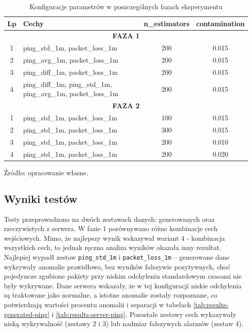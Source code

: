 \begin{table}[hptb]
	\centering
	\caption{Konfiguracje parametrów w poszczególnych fazach eksperymentu}
	\label{tab:model-test-plan}
	\vspace{10pt}
	
	\begin{tabular}{clcc}
		\toprule[1.5]
		Lp & Cechy & n\_estimators & contamination \\
		\midrule
		
		\multicolumn{4}{c}{\textbf{FAZA 1}} \\
		\midrule
		1 & ping\_std\_1m, packet\_loss\_1m & 200 & 0.015 \\
		2 & ping\_avg\_1m, packet\_loss\_1m & 200 & 0.015 \\
		3 & ping\_diff\_1m, packet\_loss\_1m & 200 & 0.015 \\
		4 & ping\_diff\_1m, ping\_std\_1m, ping\_avg\_1m, packet\_loss\_1m & 200 & 0.015 \\
		
		\midrule
		\multicolumn{4}{c}{\textbf{FAZA 2}} \\
		\midrule
		1 & ping\_std\_1m, packet\_loss\_1m & 100 & 0.015 \\
		2 & ping\_std\_1m, packet\_loss\_1m & 300 & 0.015 \\
		3 & ping\_std\_1m, packet\_loss\_1m & 200 & 0.010 \\
		4 & ping\_std\_1m, packet\_loss\_1m & 200 & 0.020 \\
		
		\bottomrule[1.5]
	\end{tabular}
	
	\vspace{10pt}
	\small Źródło: opracowanie własne.
\end{table}

\subsection{Wyniki testów}

Testy przeprowadzono na dwóch zestawach danych: generowanych oraz rzeczywistych z serwera. W fazie 1 porównywano różne kombinacje cech wejściowych. Mimo, że najlepszy wynik wskazywał wariant 4 - kombinacja wszystkich cech, to jednak ręczna analiza wyników okazała inny rezultat. Najlepiej wypadł zestaw \texttt{ping\_std\_1m} i \texttt{packet\_loss\_1m} – generowane dane wykrywały anomalie prawidłowo, bez wyników fałszywie pozytywnych, choć pojedyncze zgubione pakiety przy niskim odchyleniu standardowym czasami nie były wykrywane. Dane serwera wskazały, że w tej konfiguracji niskie odchylenia są traktowane jako normalne, a istotne anomalie zostały rozpoznane, co potwierdzają wartości procentu anomalii i separacji w tabelach \ref{tab:results-generated-ping} i \ref{tab:results-server-ping}. Pozostałe zestawy cech wykazywały niską wykrywalność (zestawy 2 i 3) lub nadmiar fałszywych alarmów (zestaw 4).


